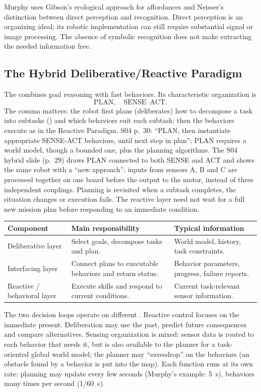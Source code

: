 Murphy uses Gibson's ecological approach for affordances and Neisser's distinction between direct perception and recognition. Direct perception is an organizing ideal; its robotic implementation can still require substantial signal or image processing. The absence of symbolic recognition does not make extracting the needed information free.

\subsection{The Hybrid Deliberative/Reactive Paradigm}
The  combines goal reasoning with fast behaviors. Its characteristic organization is
\[
 \text{PLAN},\quad \text{SENSE--ACT}.
\]
The comma matters: the robot first plans (deliberates) how to decompose a task into subtasks () and which behaviors suit each subtask; then the behaviors execute as in the Reactive Paradigm. S04 p.~30: ``PLAN, then instantiate appropriate SENSE-ACT behaviors, until next step in plan''; PLAN requires a world model, though a bounded one, plus the planning algorithms. The S04 hybrid slide (p.~29) draws PLAN connected to both SENSE and ACT and shows the same robot with a ``new approach'': inputs from sensors A, B and C are processed together on one board before the output to the motor, instead of three independent couplings. Planning is revisited when a subtask completes, the situation changes or execution fails. The reactive layer need not wait for a full new mission plan before responding to an immediate condition.

\par\smallskip\begin{tabularx}{\linewidth}{@{}L{37mm}YY@{}}
\toprule
Component & Main responsibility & Typical information \\
\midrule
Deliberative layer & Select goals, decompose tasks and plan. & World model, history, task constraints. \\
Interfacing layer & Connect plans to executable behaviors and return status. & Behavior parameters, progress, failure reports. \\
Reactive / behavioral layer & Execute skills and respond to current conditions. & Current task-relevant sensor information. \\
\bottomrule
\end{tabularx}\par\smallskip

The two decision loops operate on different . Reactive control focuses on the immediate present. Deliberation may use the past, predict future consequences and compare alternatives. Sensing organization is mixed: sensor data is routed to each behavior that needs it, but is also available to the planner for a task-oriented global world model; the planner may ``eavesdrop'' on the behaviors (an obstacle found by a behavior is put into the map). Each function runs at its own rate: planning may update every few seconds (Murphy's example: 5~s), behaviors many times per second (1/60~s).

